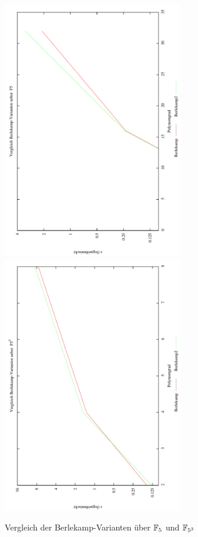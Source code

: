 \begin{figure}
  \caption{Vergleich der Berlekamp-Varianten über $\mathbb{F}_5$ und $\mathbb{F}_{5^3}$}
  \label{fig:berlekamp}
  \centering
  \includegraphics[width=0.7\textwidth,angle=-90]{plots/benchBerle_F5.pdf}
  \includegraphics[width=0.7\textwidth,angle=-90]{plots/benchBerle_F53.pdf}
\end{figure}
